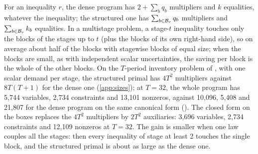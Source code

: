 For an inequality $r$, the dense program has $2 + \sum_b q_b$ multipliers and $k$ equalities, whatever the inequality;
the structured one has $\sum_{b\in\mathcal{B}_r} q_b$ multipliers and $\sum_{b\in\mathcal{B}_r} k_b$ equalities.
In a multistage problem, a stage-$t$ inequality touches only the blocks of the stages up to $t$ (plus the blocks of its own right-hand side),
so on average about half of the blocks with stagewise blocks of equal size;
when the blocks are small, as with independent scalar uncertainties, the saving per block is the whole of the other blocks.
On the $T$-period inventory problem of , with one scalar demand per stage, the structured primal has
$4T^2$ multipliers against $8T(T+1)$ for the dense one (\cref{app:sizes});
at $T = 32$, the whole program has 5,744 variables, 2,734 constraints and 13,101 nonzeros,
against 10,096, 5,408 and 21,807 for the dense program on the same canonical form ().
The closed form on the boxes replaces the $4T^2$ multipliers by $2T^2$ auxiliaries: 3,696 variables, 2,734 constraints and 12,109 nonzeros at $T = 32$.
The gain is smaller when one law couples all the stages:
then every inequality of stage at least 2 touches the single block, and the structured primal is about as large as the dense one.
